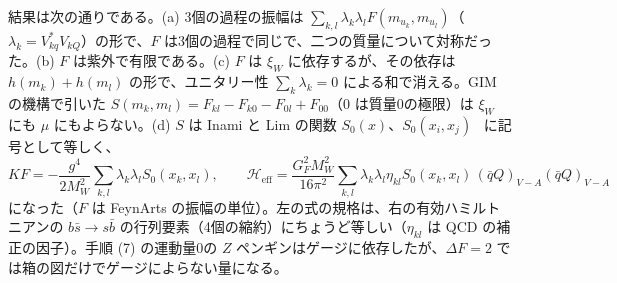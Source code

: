\documentclass[a4paper,10pt]{ltjsarticle}
\begin{document}
結果は次の通りである。(a) 3個の過程の振幅は $\sum_{k,l}\lambda_k\lambda_lF(m_{u_k},m_{u_l})$（$\lambda_k=V^*_{kq}V_{kQ}$）の形で、$F$ は3個の過程で同じで、二つの質量について対称だった。(b) $F$ は紫外で有限である。(c) $F$ は $\xi_W$ に依存するが、その依存は $h(m_k)+h(m_l)$ の形で、ユニタリー性 $\sum_k\lambda_k=0$ による和で消える。GIM の機構で引いた $S(m_k,m_l)=F_{kl}-F_{k0}-F_{0l}+F_{00}$（0 は質量0の極限）は $\xi_W$ にも $\mu$ にもよらない。(d) $S$ は Inami と Lim の関数 $S_0(x)$、$S_0(x_i,x_j)$~\cite{il81,bbl96} に記号として等しく、
\begin{equation}
KF=-\frac{g^4}{2M_W^2}\sum_{k,l}\lambda_k\lambda_lS_0(x_k,x_l),\qquad
\mathcal H_{\mathrm{eff}}=\frac{G_F^2M_W^2}{16\pi^2}\sum_{k,l}\lambda_k\lambda_l\eta_{kl}S_0(x_k,x_l)\,(\bar qQ)_{V-A}(\bar qQ)_{V-A}
\label{eq:df2norm}
\end{equation}
になった（$F$ は FeynArts の振幅の単位）。左の式の規格は、右の有効ハミルトニアンの $b\bar s\to s\bar b$ の行列要素（4個の縮約）にちょうど等しい（$\eta_{kl}$ は QCD の補正の因子）。手順 (7) の運動量0の $Z$ ペンギンはゲージに依存したが、$\Delta F=2$ では箱の図だけでゲージによらない量になる。
\end{document}
